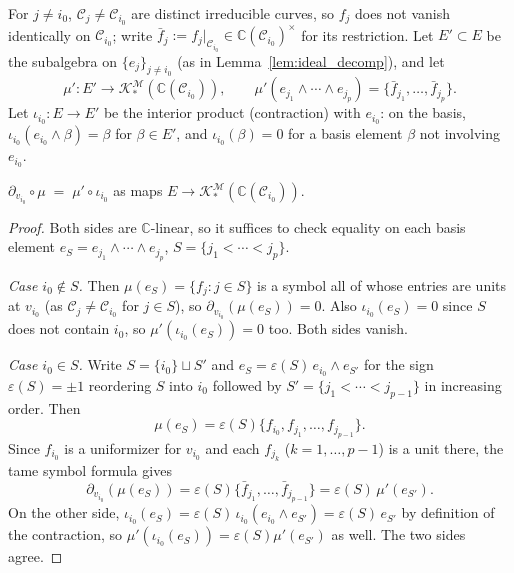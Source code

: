 \documentclass[article,11pt]{amsart} \numberwithin{equation}{section}
\numberwithin{equation}{section}
\begin{document}
{For $j\neq i_0$, $\mathscr C_j\neq \mathscr C_{i_0}$ are distinct irreducible curves, so
$f_j$ does not vanish identically on $\mathscr C_{i_0}$; write
$\bar f_j:=f_j|_{\mathscr C_{i_0}}\in\mathbb C(\mathscr C_{i_0})^\times$ for its restriction. Let
$E'\subset E$ be the subalgebra on $\{e_j\}_{j\neq i_0}$ (as in Lemma~\ref{lem:ideal_decomp}),
and let
\[
\mu': E'\longrightarrow \mathcal K^\mathcal M_*(\mathbb C(\mathscr C_{i_0})),\qquad
\mu'(e_{j_1}\wedge\cdots\wedge e_{j_{p}}) = \{\bar f_{j_1},\dots,\bar f_{j_{p}}\}.
\]
Let $\iota_{i_0}: E\longrightarrow E'$ be the interior product (contraction) with
$e_{i_0}$: on the basis, $\iota_{i_0}(e_{i_0}\wedge\beta)=\beta$ for
$\beta\in E'$, and $\iota_{i_0}(\beta)=0$ for a basis element $\beta$ not
involving $e_{i_0}$.


\begin{thm}
	\label{thm:B}
	$\partial_{v_{i_0}}\circ\mu \;=\; \mu'\circ\iota_{i_0}$ as maps $E\longrightarrow
	\mathcal K^\mathcal M_*(\mathbb C(\mathscr C_{i_0}))$.
\end{thm}

\begin{proof}
	Both sides are $\mathbb C$-linear, so it suffices to check equality on each basis
	element $e_S=e_{j_1}\wedge\cdots\wedge e_{j_p}$, $S=\{j_1<\cdots<j_p\}$.
	
	\emph{Case $i_0\notin S$.} Then $\mu(e_S)=\{f_j:j\in S\}$ is a symbol all of
	whose entries are units at $v_{i_0}$ (as $\mathscr C_j\neq \mathscr C_{i_0}$ for $j\in S$), so
	$\partial_{v_{i_0}}(\mu(e_S))=0$. Also $\iota_{i_0}(e_S)=0$ since $S$ does
	not contain $i_0$, so $\mu'(\iota_{i_0}(e_S))=0$ too. Both sides vanish.
	
	\emph{Case $i_0\in S$.} Write $S=\{i_0\}\sqcup S'$ and
	$e_S=\varepsilon(S)\,e_{i_0}\wedge e_{S'}$ for the sign $\varepsilon(S)=\pm1$
	reordering $S$ into $i_0$ followed by $S'=\{j_1<\cdots<j_{p-1}\}$ in
	increasing order. Then
	\[
	\mu(e_S)=\varepsilon(S)\{f_{i_0},f_{j_1},\dots,f_{j_{p-1}}\}.
	\]
	Since $f_{i_0}$ is a uniformizer for $v_{i_0}$ and each $f_{j_k}$
	($k=1,\dots,p-1$) is a unit there, the tame symbol formula gives
	\[
	\partial_{v_{i_0}}(\mu(e_S)) = \varepsilon(S)\{\bar f_{j_1},\dots,\bar f_{j_{p-1}}\}
	= \varepsilon(S)\,\mu'(e_{S'}).
	\]
	On the other side, $\iota_{i_0}(e_S)=\varepsilon(S)\,\iota_{i_0}(e_{i_0}\wedge
	e_{S'})=\varepsilon(S)\,e_{S'}$ by definition of the contraction, so
	$\mu'(\iota_{i_0}(e_S))=\varepsilon(S)\mu'(e_{S'})$ as well. The two sides
	agree.
\end{proof}

}
\end{document}

